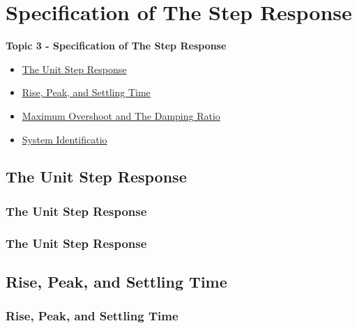\documentclass[fleqn]{beamer} %
\newcommand{\sectionIVtitle}{Specification of The Step Response}
\newcommand{\sectionIVsubsectionItitle}{The Unit Step Response}
\newcommand{\sectionIVsubsectionIItitle}{Rise, Peak, and Settling Time}
\newcommand{\sectionIVsubsectionIIItitle}{Maximum Overshoot and The Damping Ratio}
\newcommand{\sectionIVsubsectionIVtitle}{System Identificatio}
\begin{document}
	\section{\sectionIVtitle}\label{sectionIV}

		\begin{frame}
			\large \textbf{Topic 3 - \sectionIVtitle} \vspace{3mm}\\

			\begin{itemize}
				\item \hyperlink{sectionIVsubsectionI}{\sectionIVsubsectionItitle} \vspc %
				\item \hyperlink{sectionIVsubsectionII}{\sectionIVsubsectionIItitle} \vspc %
				\item \hyperlink{sectionIVsubsectionIII}{\sectionIVsubsectionIIItitle} \vspc %
				\item \hyperlink{sectionIVsubsectionIV}{\sectionIVsubsectionIVtitle} \vspc %

			\end{itemize}

		\end{frame}

		\subsection{\sectionIVsubsectionItitle}\label{sectionIVsubsectionI}

			\begin{frame}
				\frametitle{\sectionIVsubsectionItitle}
				\bigskip


				\btVFill
			\end{frame}

			\begin{frame}
				\frametitle{\sectionIVsubsectionItitle}
				\bigskip

			
				
				\btVFill
			\end{frame}

		\subsection{\sectionIVsubsectionIItitle}\label{sectionIVsubsectionII}	

			\begin{frame}
				\frametitle{\sectionIVsubsectionIItitle}
				\bigskip

				
	
				\btVFill
			\end{frame}
\end{document}
